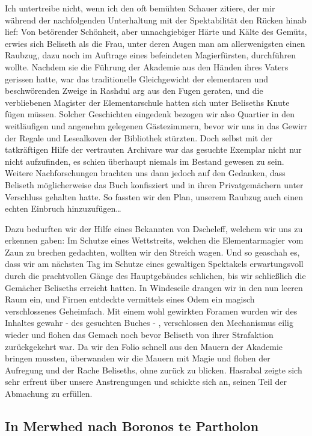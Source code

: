 Ich untertreibe nicht, wenn ich den oft bemühten Schauer zitiere, der mir während der nachfolgenden Unterhaltung mit der Spektabilität den Rücken hinab lief: Von betörender Schönheit, aber unnachgiebiger Härte und Kälte des Gemüts, erwies sich Beliseth als die Frau, unter deren Augen man am allerwenigsten einen Raubzug, dazu noch im Auftrage eines befeindeten Magierfürsten, durchführen wollte. Nachdem sie die Führung der Akademie aus den Händen ihres Vaters gerissen hatte, war das traditionelle Gleichgewicht der elementaren und beschwörenden Zweige in Rashdul arg aus den Fugen geraten, und die verbliebenen Magister der Elementarschule hatten sich unter Beliseths Knute fügen müssen. Solcher Geschichten eingedenk bezogen wir also Quartier in den weitläufigen und angenehm gelegenen Gästezimmern, bevor wir uns in das Gewirr der Regale und Lesealkoven der Bibliothek stürzten. Doch selbst mit der tatkräftigen Hilfe der vertrauten Archivare war das gesuchte Exemplar nicht nur nicht aufzufinden, es schien überhaupt niemals im Bestand gewesen zu sein. Weitere Nachforschungen brachten uns dann jedoch auf den Gedanken, dass Beliseth möglicherweise das Buch konfisziert und in ihren Privatgemächern unter Verschluss gehalten hatte. So fassten wir den Plan, unserem Raubzug auch einen echten Einbruch hinzuzufügen\dots

Dazu bedurften wir der Hilfe eines Bekannten von Dscheleff, welchem wir uns zu erkennen gaben: Im Schutze eines Wettstreits, welchen die Elementarmagier vom Zaun zu brechen gedachten, wollten wir den Streich wagen. Und so geaschah es, dass wir am nächsten Tag im Schutze eines gewaltigen Spektakels erwartungsvoll durch die prachtvollen Gänge des Hauptgebäudes schlichen, bis wir schließlich die Gemächer Beliseths erreicht hatten. In Windeseile drangen wir in den nun leeren Raum ein, und Firnen entdeckte vermittels eines Odem ein magisch verschlossenes Geheimfach. Mit einem wohl gewirkten Foramen wurden wir des Inhaltes gewahr - des gesuchten Buches - , verschlossen den Mechanismus eilig wieder und flohen das Gemach noch bevor Beliseth von ihrer Strafaktion zurückgekehrt war. Da wir den Folio schnell aus den Mauern der Akademie bringen mussten, überwanden wir die Mauern mit Magie und flohen der Aufregung und der Rache Beliseths, ohne zurück zu blicken.
Hasrabal zeigte sich sehr erfreut über unsere Anstrengungen und schickte sich an, seinen Teil der Abmachung zu erfüllen.

\subsection{In Merwhed nach Boronos te Partholon}

